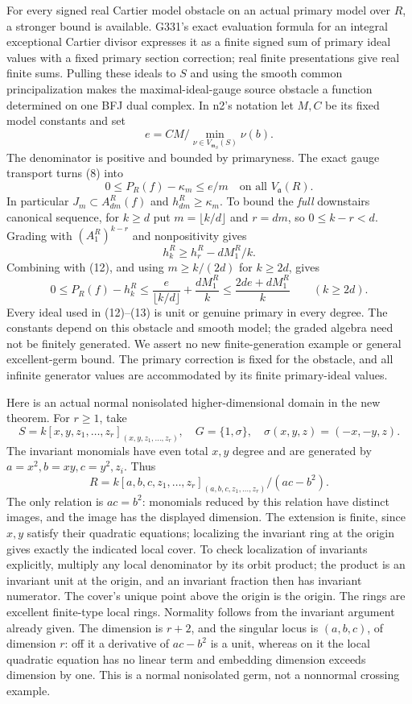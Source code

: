 For every signed real Cartier model obstacle on an actual primary model over $R$, a stronger bound is available. G331's exact evaluation formula for an integral exceptional Cartier divisor expresses it as a finite signed sum of primary ideal values with a fixed primary section correction; real finite presentations give real finite sums. Pulling these ideals to $S$ and using the smooth common principalization makes the maximal-ideal-gauge source obstacle a function determined on one BFJ dual complex. In n2's notation let $M,C$ be its fixed model constants and set
\[
 e=CM/\min_{\nu\in V_{\mathfrak m_S}(S)}\nu(b).
\]
The denominator is positive and bounded by primaryness. The exact gauge transport turns (8) into
\[
 0\le P_R(f)-\kappa_m\le e/m \quad\text{on all }V_{\mathfrak a}(R). \tag{12}
\]
In particular $J_m\subset A_{dm}^R(f)$ and $h_{dm}^R\ge\kappa_m$. To bound the \emph{full} downstairs canonical sequence, for $k\ge d$ put $m=\lfloor k/d\rfloor$ and $r=dm$, so $0\le k-r<d$. Grading with $(A_1^R)^{k-r}$ and nonpositivity gives
\[
 h_k^R\ge h_r^R-dM_1^R/k.
\]
Combining with (12), and using $m\ge k/(2d)$ for $k\ge2d$, gives
\[
 0\le P_R(f)-h_k^R
 \le \frac{e}{\lfloor k/d\rfloor}+\frac{dM_1^R}{k}
 \le\frac{2de+dM_1^R}{k}\qquad(k\ge2d). \tag{13}
\]
Every ideal used in (12)--(13) is unit or genuine primary in every degree. The constants depend on this obstacle and smooth model; the graded algebra need not be finitely generated. We assert no new finite-generation example or general excellent-germ bound. The primary correction is fixed for the obstacle, and all infinite generator values are accommodated by its finite primary-ideal values.

Here is an actual normal nonisolated higher-dimensional domain in the new theorem. For $r\ge1$, take
\[
 S=k[x,y,z_1,\ldots,z_r]_{(x,y,z_1,\ldots,z_r)},\quad
 G=\{1,\sigma\},\quad \sigma(x,y,z)=(-x,-y,z).
\]
The invariant monomials have even total $x,y$ degree and are generated by $a=x^2,b=xy,c=y^2,z_i$. Thus
\[
 R=k[a,b,c,z_1,\ldots,z_r]_{(a,b,c,z_1,\ldots,z_r)}/(ac-b^2).
\]
The only relation is $ac=b^2$: monomials reduced by this relation have distinct images, and the image has the displayed dimension. The extension is finite, since $x,y$ satisfy their quadratic equations; localizing the invariant ring at the origin gives exactly the indicated local cover. To check localization of invariants explicitly, multiply any local denominator by its orbit product; the product is an invariant unit at the origin, and an invariant fraction then has invariant numerator. The cover's unique point above the origin is the origin. The rings are excellent finite-type local rings. Normality follows from the invariant argument already given. The dimension is $r+2$, and the singular locus is $(a,b,c)$, of dimension $r$: off it a derivative of $ac-b^2$ is a unit, whereas on it the local quadratic equation has no linear term and embedding dimension exceeds dimension by one. This is a normal nonisolated germ, not a nonnormal crossing example.

